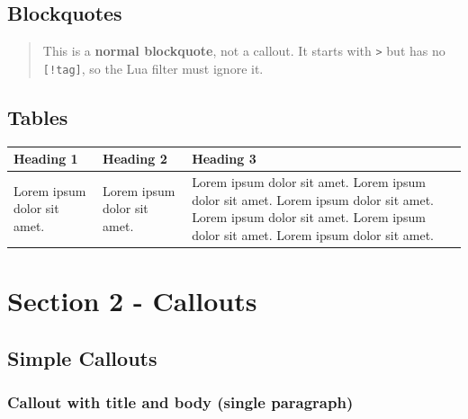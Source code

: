 \subsection{Blockquotes}\label{blockquotes}

\begin{quote}
This is a \textbf{normal blockquote}, not a callout. It starts with
\texttt{\textgreater{}} but has no \texttt{{[}!tag{]}}, so the Lua
filter must ignore it.
\end{quote}

\subsection{Tables}\label{tables}

{\def\LTcaptype{none} %
\begin{longtable}[]{@{}
  >{\raggedright\arraybackslash}p{}
  >{\raggedright\arraybackslash}p{}
  >{\raggedright\arraybackslash}p{}@{}}
\toprule\noalign{}
\begin{minipage}[b]{\linewidth}\raggedright
Heading 1
\end{minipage} & \begin{minipage}[b]{\linewidth}\raggedright
Heading 2
\end{minipage} & \begin{minipage}[b]{\linewidth}\raggedright
Heading 3
\end{minipage} \\
\midrule\noalign{}
\endhead
\bottomrule\noalign{}
\endlastfoot
Lorem ipsum dolor sit amet. & Lorem ipsum dolor sit amet. & Lorem ipsum
dolor sit amet. Lorem ipsum dolor sit amet. Lorem ipsum dolor sit amet.
Lorem ipsum dolor sit amet. Lorem ipsum dolor sit amet. Lorem ipsum
dolor sit amet. \\
\end{longtable}
}

\section{Section 2 - Callouts}\label{section-2---callouts}

\subsection{Simple Callouts}\label{simple-callouts}

\subsubsection{Callout with title and body (single
paragraph)}\label{callout-with-title-and-body-single-paragraph}

